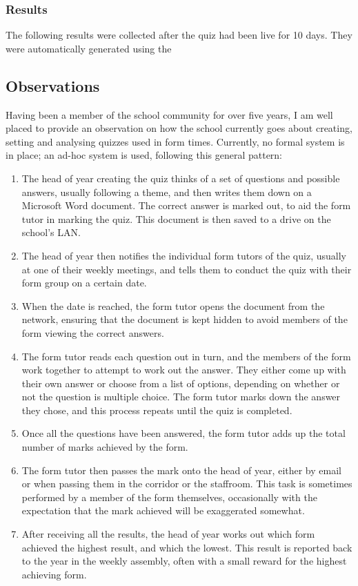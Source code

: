 \subsubsection{Results}
The following results were collected after the quiz had been live for 10 days. They were automatically generated using the 

\subsection{Observations}
Having been a member of the school community for over five years, I am well placed to provide an observation on how the school currently goes about creating, setting and analysing quizzes used in form times. Currently, no formal system is in place; an ad-hoc system is used, following this general pattern:

\begin{enumerate}
	\item The head of year creating the quiz thinks of a set of questions and possible answers, usually following a theme, and then writes them down on a Microsoft Word document. The correct answer is marked out, to aid the form tutor in marking the quiz. This document is then saved to a drive on the school's LAN.

	\item The head of year then notifies the individual form tutors of the quiz, usually at one of their weekly meetings, and tells them to conduct the quiz with their form group on a certain date.

	\item When the date is reached, the form tutor opens the document from the network, ensuring that the document is kept hidden to avoid members of the form viewing the correct answers.

	\item The form tutor reads each question out in turn, and the members of the form work together to attempt to work out the answer. They either come up with their own answer or choose from a list of options, depending on whether or not the question is multiple choice. The form tutor marks down the answer they chose, and this process repeats until the quiz is completed.

	\item Once all the questions have been answered, the form tutor adds up the total number of marks achieved by the form.

	\item The form tutor then passes the mark onto the head of year, either by email or when passing them in the corridor or the staffroom. This task is sometimes performed by a member of the form themselves, occasionally with the expectation that the mark achieved will be exaggerated somewhat.

	\item After receiving all the results, the head of year works out which form achieved the highest result, and which the lowest. This result is reported back to the year in the weekly assembly, often with a small reward for the highest achieving form.
\end{enumerate}

